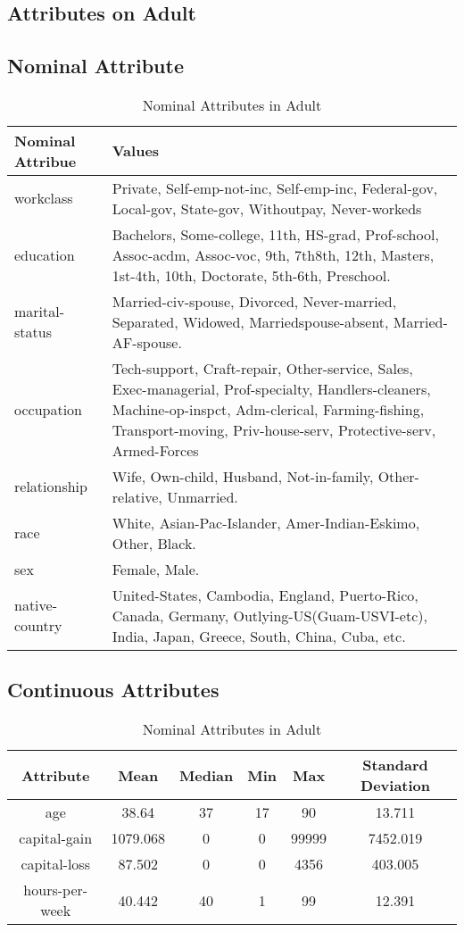 \documentclass[letterpaper,12pt]{article}
\begin{document}
\begin{appendices}
\section{Attributes on Adult}
\subsection{Nominal Attribute}
\begin{table}[ht]
\centering
\begin{tabular}{|l|p{9cm}|} %
\hline 
Nominal Attribue & Values\\
\hline 
workclass & Private, Self-emp-not-inc, Self-emp-inc, Federal-gov, Local-gov, State-gov, Withoutpay, Never-workeds \\
\hline 
education & Bachelors, Some-college, 11th, HS-grad, Prof-school, Assoc-acdm, Assoc-voc, 9th, 7th8th, 12th, Masters, 1st-4th, 10th, Doctorate, 5th-6th, Preschool. \\
\hline
marital-status & Married-civ-spouse, Divorced, Never-married, Separated, Widowed, Marriedspouse-absent, Married-AF-spouse. \\
\hline
occupation & Tech-support, Craft-repair, Other-service, Sales, Exec-managerial, Prof-specialty, Handlers-cleaners, Machine-op-inspct, Adm-clerical, Farming-fishing, Transport-moving, Priv-house-serv, Protective-serv, Armed-Forces \\
\hline
relationship & Wife, Own-child, Husband, Not-in-family, Other-relative, Unmarried. \\
\hline
race & White, Asian-Pac-Islander, Amer-Indian-Eskimo, Other, Black. \\
\hline
sex & Female, Male. \\
\hline
native-country & United-States, Cambodia, England, Puerto-Rico, Canada, Germany, Outlying-US(Guam-USVI-etc), India, Japan, Greece, South, China, Cuba, etc.\\
\hline
\end{tabular}
\caption{Nominal Attributes in Adult}
\end{table}
\newpage

\subsection{Continuous Attributes}
\begin{table}[hbpt]
\centering
\begin{tabular}{|c|c|c|c|c|c|} %
\hline 
Attribute & Mean & Median & Min & Max & Standard Deviation\\
\hline 
age & 38.64 & 37 & 17 & 90 & 13.711 \\
\hline
capital-gain &  1079.068 & 0 & 0 & 99999 & 7452.019\\ 
\hline
capital-loss & 87.502 & 0 & 0 & 4356 & 403.005 \\ 
\hline
hours-per-week & 40.442 & 40 & 1 & 99 & 12.391 \\
\hline
\end{tabular}
\caption{Nominal Attributes in Adult}
\end{table}


\end{appendices}
\end{document}
